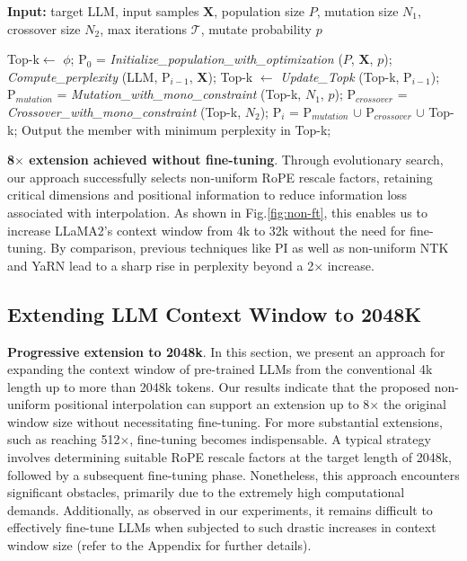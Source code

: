 \begin{algorithm}[t]
	\small
	\caption{The search algorithm}
	\textbf{Input:} target LLM, input samples $\mathbf{X}$,   population size $P$, mutation size $N_1$, crossover size $N_2$, max iterations $\mathcal{T}$, mutate probability $p$\\

	\begin{algorithmic}[1]
		\label{alg:search}
		\STATE Top-k$\leftarrow$ $\phi$;	
		\STATE $\text{P}_0$ = \textit{Initialize\_population\_with\_optimization} ($P$, $\mathbf{X}$, $p$); 
		\STATE \textit{Compute\_perplexity} (LLM, $\text{P}_{i-1}$, $\mathbf{X}$);
		\STATE Top-k $\leftarrow$ \textit{Update\_Topk} (Top-k, $\text{P}_{i-1}$);
		\STATE $\text{P}_{mutation}$ = \textit{Mutation\_with\_mono\_constraint} (Top-k, $N_1$, $p$); 
		\STATE $\text{P}_{crossover}$ = \textit{Crossover\_with\_mono\_constraint} (Top-k, $N_2$);
		\STATE $\text{P}_i$ = $\text{P}_{mutation}$ $\cup$ $\text{P}_{crossover}$ $\cup$ Top-k;
		\ENDFOR
		\STATE Output the member with minimum perplexity in Top-k;
	\end{algorithmic}
\end{algorithm}

\textbf{8$\times$ extension achieved without fine-tuning}. Through evolutionary search, our approach successfully selects non-uniform RoPE rescale factors, retaining critical dimensions and positional information to reduce information loss associated with interpolation. As shown in Fig.\ref{fig:non-ft}, this enables us to increase LLaMA2's context window from 4k to 32k without the need for fine-tuning. By comparison, previous techniques like PI as well as non-uniform NTK and YaRN lead to a sharp rise in perplexity beyond a 2$\times$ increase.

\subsection{Extending LLM Context Window to 2048K}
\label{sec:extendto2048k}

\textbf{Progressive extension to 2048k}. In this section, we present an approach for expanding the context window of pre-trained LLMs from the conventional 4k length up to more than 2048k tokens. Our results indicate that the proposed non-uniform positional interpolation can support an extension up to 8$\times$ the original window size without necessitating fine-tuning. For more substantial extensions, such as reaching 512$\times$, fine-tuning becomes indispensable. A typical strategy involves determining suitable RoPE rescale factors at the target length of 2048k, followed by a subsequent fine-tuning phase. Nonetheless, this approach encounters significant obstacles, primarily due to the extremely high computational demands. Additionally, as observed in our experiments, it remains difficult to effectively fine-tune LLMs when subjected to such drastic increases in context window size (refer to the Appendix for further details).

